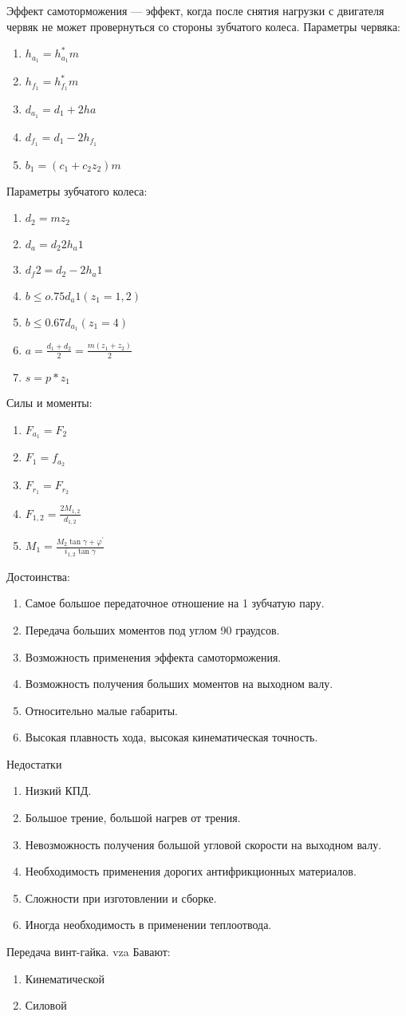 \documentclass{article}
\begin{document}
Эффект самоторможения --- эффект, когда после снятия нагрузки с двигателя червяк не может провернуться со стороны зубчатого колеса.
Параметры червяка:
\begin{enumerate}
	\item $h_{a_1} = h_{a_1}^* m$
	\item $h_{f_1} = h_{f_1}^* m$
	\item $d_{a_1} = d_1 + 2 ha$
	\item $d_{f_1} = d_1 - 2 h_{f_1}$
	\item $b_1 = (c_1 +  c_2 z_2) m$
\end{enumerate}
Параметры зубчатого колеса:
\begin{enumerate}
	\item $d_2 = m z_2$
	\item $d_a = d_2 2h_a1$
	\item $d_f2 = d_2 - 2 h_a1$
	\item $b \le o.75 d_a1 (z_1 = 1 , 2)$
	\item $b \le 0.67 d_{a_1} (z_1 = 4)$
	\item $a = \frac{d_1 + d_2}{2} = \frac{m (z_1 + z_2)}{2}$
	\item $s = p * z_1$
\end{enumerate}
Силы и моменты:
\begin{enumerate}
	\item $F_{a_1} = F_2$
	\item $F_1 = f_{a_2}$
	\item $F_{r_1} = F_{r_2}$
	\item $F_{1,2} = \frac{2 M_{1,2}}{d_{1,2}} $
	\item $M_{1} = \frac{M_2 \tan{ \gamma + \varphi^{'}}}{i_{1,2} \tan{ \gamma}} $
\end{enumerate}
Достоинства:
\begin{enumerate}
	\item Самое большое передаточное отношение на 1 зубчатую пару.
	\item Передача больших моментов под углом 90 граудсов.
	\item Возможность применения эффекта самоторможения.
	\item Возможность получения больших моментов на выходном валу.
	\item Относительно малые габариты.
	\item Высокая плавность хода, высокая кинематическая точность.
\end{enumerate}
Недостатки
\begin{enumerate}
	\item Низкий КПД.
	\item Большое трение, большой нагрев от трения.
	\item Невозможность получения большой угловой скорости на выходном валу.
	\item Необходимость применения дорогих антифрикционных материалов.
	\item Сложности при изготовлении и сборке.
	\item Иногда необходимость в применении теплоотвода.
\end{enumerate}

Передача винт-гайка.
vza
Бавают:
\begin{enumerate}
	\item Кинематической
	\item Силовой
\end{enumerate}
\end{document}
